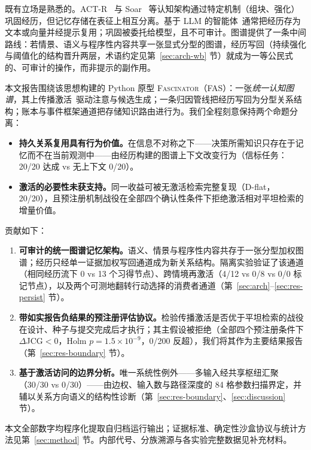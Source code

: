 \documentclass[10pt,a4paper]{ctexart}
\begin{document}
既有立场是熟悉的。ACT-R~\citep{anderson2004integrated} 与 Soar~\citep{laird2012soar} 等认知架构通过特定机制（组块、强化）巩固经历，但记忆存储在表征上相互分离。基于 LLM 的智能体~\citep{yao2023react,park2023generative,shinn2023reflexion}通常把经历存为文本或向量并经提示复用；巩固被委托给模型，且不可审计。图谱提供了一条中间路线：若情景、语义与程序性内容共享一张显式分型的图谱，经历写回（持续强化与阈值化的结构晋升两层，术语约定见第~\ref{sec:arch-wb} 节）就成为一等公民式的、可审计的操作，而非提示的副作用。

本文报告围绕该思想构建的 Python 原型 \textsc{Fascinator}（FAS）：一张\emph{统一认知图谱}，其上传播激活~\citep{collins1975spreading}驱动注意与候选生成；一条归因管线把经历写回为分型关系结构；账本与事件框架通道把存储知识路由进行为。我们全程刻意保持两个命题分离：

\begin{itemize}
\item[(a)] \textbf{持久关系复用具有行为价值。}在信息不对称之下——决策所需知识只存在于记忆而不在当前观测中——由经历构建的图谱上下文改变行为（信标任务：20/20 达成 vs 无上下文 0/20）。
\item[(b)] \textbf{激活的必要性未获支持。}同一收益可被无激活检索完整复现（D-flat，20/20），且预注册机制战役在全部四个确认性条件下拒绝激活相对平坦检索的增量价值。
\end{itemize}

贡献如下：
\begin{enumerate}
\item \textbf{可审计的统一图谱记忆架构。}语义、情景与程序性内容共存于一张分型加权图谱；经历只经单一证据加权写回通道成为新关系结构。隔离实验验证了该通道（相同经历流下 0 vs 13 个习得节点）、跨情境再激活（4/12 vs 0/8 vs 0/0 标记节点），以及两个可测地翻转行动选择的消费者通道（第~\ref{sec:arch}--\ref{sec:res-persist} 节）。
\item \textbf{带如实报告负结果的预注册评估协议。}检验传播激活是否优于平坦检索的战役在设计、种子与提交完成后才执行；其主假设被拒绝（全部四个预注册条件下 $\Delta$JCG${<}0$，Holm $p{=}1.5\times10^{-9}$，0/200 反超），我们将其作为主要结果报告（第~\ref{sec:res-boundary} 节）。
\item \textbf{基于激活访问的边界分析。}唯一系统性例外——多输入经共享枢纽汇聚（30/30 vs 0/30）——由边权、输入数与路径深度的 84 格参数扫描界定，并辅以关系方向语义的结构性诊断（第~\ref{sec:res-boundary}、\ref{sec:discussion} 节）。
\end{enumerate}

本文全部数字均程序化提取自归档运行输出；证据标准、确定性沙盒协议与统计方法见第~\ref{sec:method} 节。内部代号、分族溯源与各实验完整数据见补充材料。
\end{document}

